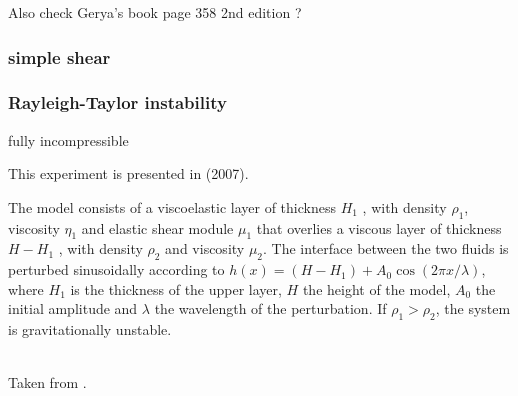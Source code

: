 Also check Gerya's book page 358 2nd edition ?






\subsubsection{simple shear}

\subsubsection{Rayleigh-Taylor instability}

{\color{orange} fully incompressible}

This experiment is presented in \textcite{kabe07} (2007).

The model consists of a viscoelastic layer of thickness $H_1$ , with density $\rho_1$, 
viscosity $\eta_1$ and elastic shear module $\mu_1$ that overlies a viscous
layer of thickness $H-H_1$ , with density $\rho_2$ and viscosity $\mu_2$. 
The interface between the two fluids is perturbed sinusoidally according
to $h(x) = (H - H_1 ) + A_0 \cos (2\pi x/ \lambda )$, 
where $H_1$ is the thickness of the upper layer, $H$ the height of the model, 
$A_0$ the initial amplitude and $\lambda$ the wavelength of the perturbation. 
If $\rho_1>\rho_2$, the system is gravitationally unstable.

\begin{center}
\\
{\captionfont Taken from \textcite{kabe07}.}
\end{center}

